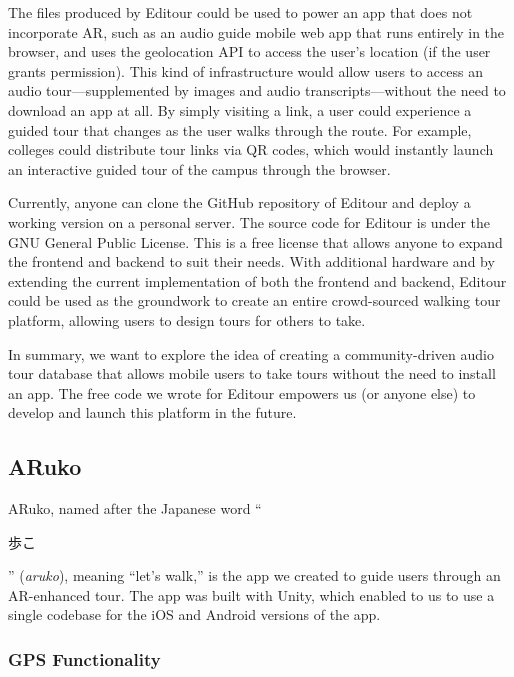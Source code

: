 \documentclass[a4paper, 10pt, american, titlepage]{article}
\begin{document}
The files produced by Editour could be used to power an app that does not
incorporate AR, such as an audio guide mobile web app that runs entirely in the
browser, and uses the geolocation API to access the user's location (if the user
grants permission). This kind of infrastructure would allow users to access an
audio tour---supplemented by images and audio transcripts---without the need to
download an app at all. By simply visiting a link, a user could experience a
guided tour that changes as the user walks through the route. For example,
colleges could distribute tour links via QR codes, which would instantly launch
an interactive guided tour of the campus through the browser.

Currently, anyone can clone the GitHub repository of Editour and deploy a
working version on a personal server. The source code for Editour is under the
GNU General Public License. This is a free license that allows anyone to expand
the frontend and backend to suit their needs. With additional hardware and by
extending the current implementation of both the frontend and backend, Editour
could be used as the groundwork to create an entire crowd-sourced walking tour
platform, allowing users to design tours for others to take.

In summary, we want to explore the idea of creating a community-driven audio
tour database that allows mobile users to take tours without the need to install
an app. The free code we wrote for Editour empowers us (or anyone else)
to develop and launch this platform in the future.

\subsection{ARuko}
\label{sec:aruko}

ARuko, named after the Japanese word ``\begin{CJK}{UTF8}{min}歩こ\end{CJK}''
(\textit{aruko}), meaning ``let's walk,'' is the app we created to guide users
through an AR-enhanced tour. The app was built with Unity, which enabled to us
to use a single codebase for the iOS and Android versions of the app.

\subsubsection{GPS Functionality}
\label{sec:gpsFunctionality}
\end{document}
